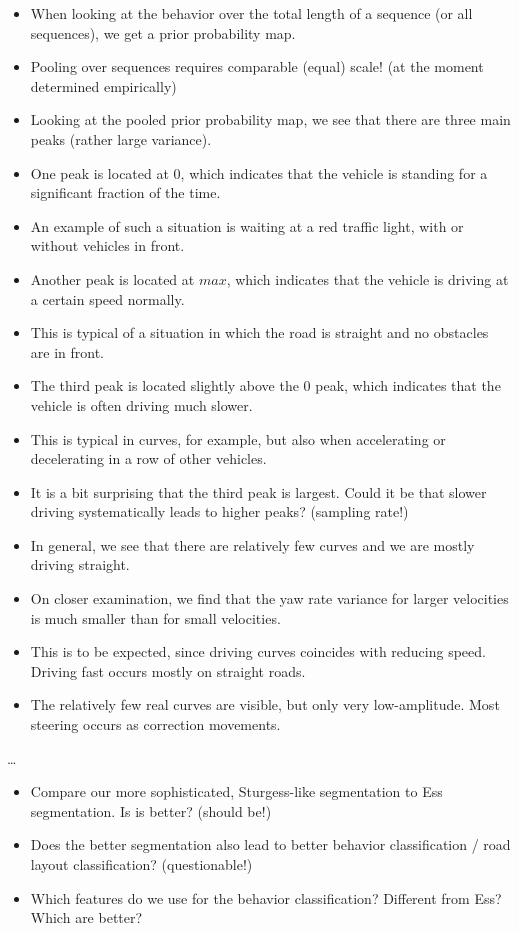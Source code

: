 \documentclass{bmvc2k}
\begin{document}
\begin{itemize}
\item When looking at the behavior over the total length of a sequence (or all sequences), we get a prior probability map.
\item Pooling over sequences requires comparable (equal) scale! (at the moment determined empirically)
\item Looking at the pooled prior probability map, we see that there are three main peaks (rather large variance).
\item One peak is located at 0, which indicates that the vehicle is standing for a significant fraction of the time.
\item An example of such a situation is waiting at a red traffic light, with or without vehicles in front.
\item Another peak is located at $max$, which indicates that the vehicle is driving at a certain speed normally.
\item This is typical of a situation in which the road is straight and no obstacles are in front.
\item The third peak is located slightly above the 0 peak, which indicates that the vehicle is often driving much slower.
\item This is typical in curves, for example, but also when accelerating or decelerating in a row of other vehicles.
\item It is a bit surprising that the third peak is largest. Could it be that slower driving systematically leads to higher peaks? (sampling rate!)
\item In general, we see that there are relatively few curves and we are mostly driving straight.
\item On closer examination, we find that the yaw rate variance for larger velocities is much smaller than for small velocities.
\item This is to be expected, since driving curves coincides with reducing speed. Driving fast occurs mostly on straight roads.
\item The relatively few real curves are visible, but only very low-amplitude. Most steering occurs as correction movements.
\end{itemize}

\dots

\begin{itemize}
\item Compare our more sophisticated, Sturgess-like segmentation to Ess segmentation. Is is better? (should be!)
\item Does the better segmentation also lead to better behavior classification / road layout classification? (questionable!)
\item Which features do we use for the behavior classification? Different from Ess? Which are better?
\end{itemize}
\end{document}
